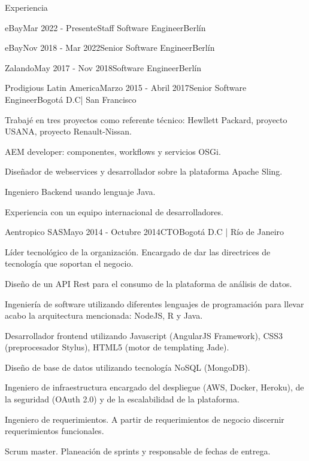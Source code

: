 \documentclass[spanish]{resume} %
\begin{document}
\begin{rSection}{Experiencia}
\begin{rSubsection}{eBay}{Mar 2022 - Presente}{Staff Software Engineer}{Berl\'in}
\begin{rSubsection}{eBay}{Nov 2018 - Mar 2022}{Senior Software Engineer}{Berl\'in}
\begin{rSubsection}{Zalando}{May 2017 - Nov 2018}{Software Engineer}{Berl\'in}
\end{rSubsection}


\begin{rSubsection}{Prodigious Latin America}{Marzo 2015 - Abril 2017}{Senior Software Engineer}{Bogot\'a D.C| San Francisco}
\item Trabajé en tres proyectos como referente técnico: Hewllett Packard, proyecto USANA, proyecto Renault-Nissan.
\item AEM developer: componentes, workflows y servicios OSGi.
\item Diseñador de webservices y desarrollador sobre la plataforma Apache Sling.  
\item Ingeniero Backend usando lenguaje Java.
\item Experiencia con un equipo internacional de desarrolladores.
\end{rSubsection}


\begin{rSubsection}{Aentropico SAS}{Mayo 2014 - Octubre 2014}{CTO}{Bogot\'a D.C | R\'io de Janeiro}
\item L\'ider tecnol\'ogico de la organizaci\'on. Encargado de dar las directrices de tecnolog\'ia que soportan el negocio.
\item Dise\~no de un API Rest para el consumo de la plataforma de an\'alisis de datos.
\item Ingenier\'ia de software utilizando diferentes lenguajes de programaci\'on para llevar acabo la arquitectura mencionada: NodeJS, R y Java.
\item Desarrollador frontend utilizando Javascript (AngularJS Framework), CSS3 (preprocesador Stylus), HTML5 (motor de templating Jade).
\item Dise\~no de base de datos utilizando tecnolog\'ia NoSQL (MongoDB).
\item Ingeniero de infraestructura encargado del despliegue (AWS, Docker, Heroku), de la seguridad (OAuth 2.0) y de la escalabilidad de la plataforma.
\item Ingeniero de requerimientos. A partir de requerimientos de negocio discernir requerimientos funcionales.
\item Scrum master. Planeaci\'on de sprints y responsable de fechas de entrega.
\end{rSubsection}



\end{rSubsection}
\end{rSubsection}
\end{rSection}
\end{document}
